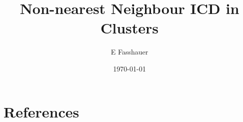 \documentclass[12pt,twocolumn]{iopart}
\begin{document}
\setlength{\tabcolsep}{12pt}


\title[Non-nearest Neighbour ICD in Clusters]{Non-nearest Neighbour ICD in
       Clusters}

\author{E Fasshauer}
\address{Centre for Theoretical and Computational Chemistry,
         Department of Chemistry, University of Troms\o,
         -- The Arctic University of Norway, N-9037 Troms\o, Norway}



\date{\today}

\begin{abstract}
 
\end{abstract}


\maketitle












\eject
\section*{References}
%
%
\end{document}
